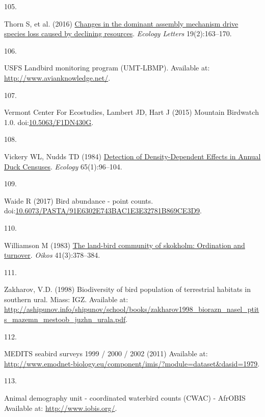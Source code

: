 \documentclass{article}
\newlength{\cslhangindent}
\newlength{\csllabelwidth}
\newlength{\cslentryspacingunit} %
\newenvironment{CSLReferences}[2] %
 {%
  \setlength{\parindent}{0pt}
  \ifodd #1
  \let\oldpar\par
  \def\par{\hangindent=\cslhangindent\oldpar}
  \fi
  \setlength{\parskip}{#2\cslentryspacingunit}
 }%
 {}
\newcommand{\CSLLeftMargin}[1]{\parbox[t]{\csllabelwidth}{#1}}
\newcommand{\CSLRightInline}[1]{\parbox[t]{\linewidth - \csllabelwidth}{#1}\break}
\begin{document}
\begin{CSLReferences}{0}{0}
\leavevmode{}%
\CSLLeftMargin{105. }%
\CSLRightInline{Thorn S, et al. (2016)
\href{https://doi.org/10.1111/ele.12548}{Changes in the dominant
assembly mechanism drive species loss caused by declining resources}.
\emph{Ecology Letters} 19(2):163--170.}

\leavevmode{}%
\CSLLeftMargin{106. }%
\CSLRightInline{USFS Landbird monitoring program (UMT-LBMP). Available
at: \url{http://www.avianknowledge.net/}.}

\leavevmode{}%
\CSLLeftMargin{107. }%
\CSLRightInline{Vermont Center For Ecostudies, Lambert JD, Hart J (2015)
Mountain Birdwatch 1.0.
doi:\href{https://doi.org/10.5063/F1DN430G}{10.5063/F1DN430G}.}

\leavevmode{}%
\CSLLeftMargin{108. }%
\CSLRightInline{Vickery WL, Nudds TD (1984)
\href{https://doi.org/10.2307/1939462}{Detection of Density-Dependent
Effects in Annual Duck Censuses}. \emph{Ecology} 65(1):96--104.}

\leavevmode{}%
\CSLLeftMargin{109. }%
\CSLRightInline{Waide R (2017) Bird abundance - point counts.
doi:\href{https://doi.org/10.6073/PASTA/91E6302E743BAC1E3E32781B869CE3D9}{10.6073/PASTA/91E6302E743BAC1E3E32781B869CE3D9}.}

\leavevmode{}%
\CSLLeftMargin{110. }%
\CSLRightInline{Williamson M (1983)
\href{https://doi.org/10.2307/3544096}{The land-bird community of
skokholm: Ordination and turnover}. \emph{Oikos} 41(3):378--384.}

\leavevmode{}%
\CSLLeftMargin{111. }%
\CSLRightInline{Zakharov, V.D. (1998) Biodiversity of bird population of
terrestrial habitats in southern ural. Miass: IGZ. Available at:
\url{http://ashipunov.info/shipunov/school/books/zakharov1998_biorazn_nasel_ptits_mazemn_mestoob_juzhn_urala.pdf}.}

\leavevmode{}%
\CSLLeftMargin{112. }%
\CSLRightInline{MEDITS seabird surveys 1999 / 2000 / 2002 (2011)
Available at:
\url{http://www.emodnet-biology.eu/component/imis/?module=dataset\&dasid=1979}.}

\leavevmode{}%
\CSLLeftMargin{113. }%
\CSLRightInline{Animal demography unit - coordinated waterbird counts
(CWAC) - AfrOBIS Available at: \url{http://www.iobis.org/}.}


\end{CSLReferences}
\end{document}
